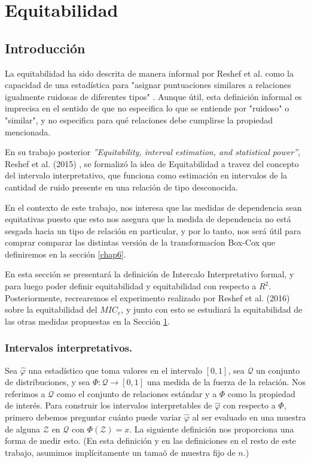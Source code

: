 \chapter{Equitabilidad}\label{chap4}

	\section{Introducci\'on}

	La equitabilidad ha sido descrita de manera informal por Reshef et al. como la capacidad de una estad\'istica para "asignar puntuaciones similares a relaciones igualmente ruidosas de diferentes tipos" \cite{Reshef2011}. Aunque \'util, esta definici\'on informal es imprecisa en el sentido de que no especifica lo que se entiende por "ruidoso" o "similar", y no especifica para qu\'e relaciones debe cumplirse la propiedad mencionada.

	En su trabajo posterior \textit{''Equitability, interval estimation, and statistical power''}, Reshef et al. (2015) \cite{Reshef2015}, se formaliz\'o la idea de Equitabilidad a travez del concepto del intervalo interpretativo, que funciona como estimaci\'on en intervalos de la cantidad de ruido presente en una relaci\'on de tipo desconocida. 

	En el contexto de este trabajo, nos interesa que las medidas de dependencia sean equitativas puesto que esto nos asegura que la medida de dependencia no est\'a sesgada hacia un tipo de relaci\'on en particular, y por lo tanto, nos ser\'a \'util para comprar comparar las distintas versi\'on de la transformac\'ion Box-Cox que definiremos en la secci\'on \ref{chap6}.

	En esta secci\'on se presentar\'a la definici\'on de Intercalo Interpretativo formal, y para luego poder definir equitabilidad y  equitabilidad con respecto a $R^2$. Posteriormente, recrearemos el experimento realizado por Reshef et al. (2016) \cite{Reshef2016} sobre la equitabilidad del $MIC_e$, y junto con esto se estudiar\'a la equitabilidad de las otras medidas propuestas en la Secci\'on \ref{chap4}. 

	\subsection[equidefiniciones]{Intervalos interpretativos.}

	Sea $\hat{\varphi}$ una estad\'istico que toma valores en el intervalo $[0,1]$, sea $\mathcal{Q}$ un conjunto de distribuciones, y sea $\Phi: \mathcal{Q} \rightarrow [0,1]$ una medida de la fuerza de la relaci\'on. Nos referimos a $\mathcal{Q}$ como el conjunto de relaciones est\'andar y a $\Phi$ como la propiedad de inter\'es. Para construir los intervalos interpretables de $\hat{\varphi}$ con respecto a $\Phi$, primero debemos preguntar cu\'anto puede variar $\hat{\varphi}$ al ser evaluado en una muestra de alguna $\mathcal{Z}$ en $\mathcal{Q}$ con $\Phi(\mathcal{Z})=x$. La siguiente definici\'on nos proporciona una forma de medir esto. (En esta definici\'on y en las definiciones en el resto de este trabajo, asumimos impl\'icitamente un tama\~o de muestra fijo de $n$.)


